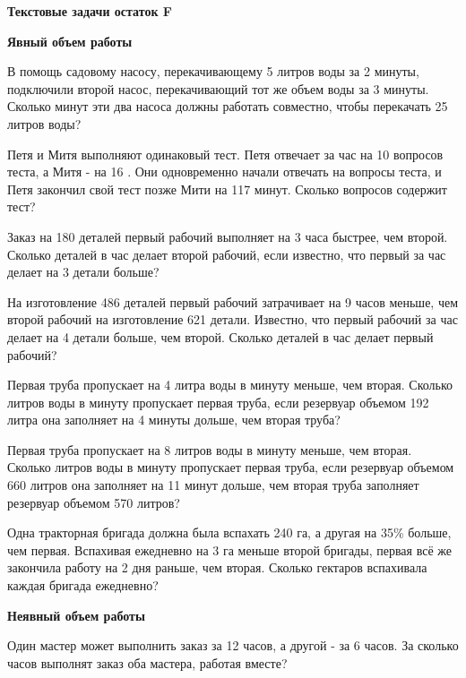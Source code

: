 \centerline{\bf \Huge Текстовые задачи остаток F}

\centerline{\bf \Huge Явный объем работы}

 В помощь садовому насосу, перекачивающему 5 литров воды за 2 минуты, подключили второй насос, перекачивающий тот же объем воды за 3 минуты. Сколько минут эти два насоса должны работать совместно, чтобы перекачать 25 литров воды?


 Петя и Митя выполняют одинаковый тест. Петя отвечает за час на 10 вопросов теста, а Митя - на 16 . Они одновременно начали отвечать на вопросы теста, и Петя закончил свой тест позже Мити на 117 минут. Сколько вопросов содержит тест?


 Заказ на 180 деталей первый рабочий выполняет на 3 часа быстрее, чем второй. Сколько деталей в час делает второй рабочий, если известно, что первый за час делает на 3 детали больше?



 На изготовление 486 деталей первый рабочий затрачивает на 9 часов меньше, чем второй рабочий на изготовление 621 детали. Известно, что первый рабочий за час делает на 4 детали больше, чем второй. Сколько деталей в час делает первый рабочий?\



 Первая труба пропускает на 4 литра воды в минуту меньше, чем вторая. Сколько литров воды в минуту пропускает первая труба, если резервуар объемом 192 литра она заполняет на 4 минуты дольше, чем вторая труба?


 Первая труба пропускает на 8 литров воды в минуту меньше, чем вторая. Сколько литров воды в минуту пропускает первая труба, если резервуар объемом 660 литров она заполняет на 11 минут дольше, чем вторая труба заполняет резервуар объемом 570 литров?


 Одна тракторная бригада должна была вспахать 240 га, а другая на 35\% больше, чем первая. Вспахивая ежедневно на 3 га меньше второй бригады, первая всё же закончила работу на 2 дня раньше, чем вторая. Сколько гектаров вспахивала каждая бригада ежедневно?


\centerline{\bf \Huge Неявный объем работы}

 Один мастер может выполнить заказ за 12 часов, а другой - за 6 часов. За сколько часов выполнят заказ оба мастера, работая вместе?



